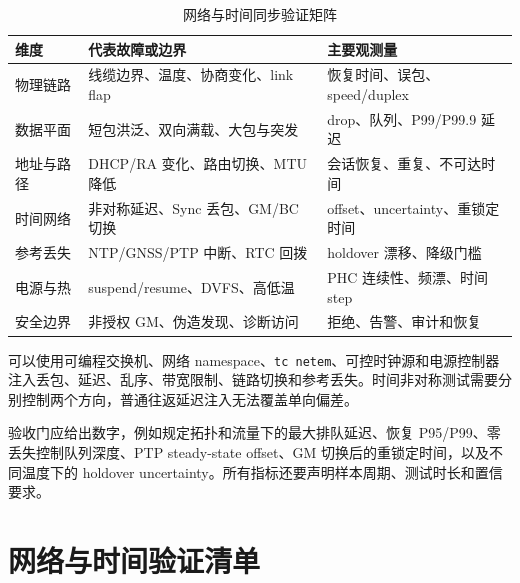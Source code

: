 \begin{table}[htbp]
  \centering
  \caption{网络与时间同步验证矩阵}
  \small
  \begin{tabular}{p{26mm}p{50mm}p{54mm}}
    \hline
    维度 & 代表故障或边界 & 主要观测量 \\
    \hline
    物理链路 & 线缆边界、温度、协商变化、link flap & 恢复时间、误包、speed/duplex \\
    数据平面 & 短包洪泛、双向满载、大包与突发 & drop、队列、P99/P99.9 延迟 \\
    地址与路径 & DHCP/RA 变化、路由切换、MTU 降低 & 会话恢复、重复、不可达时间 \\
    时间网络 & 非对称延迟、Sync 丢包、GM/BC 切换 & offset、uncertainty、重锁定时间 \\
    参考丢失 & NTP/GNSS/PTP 中断、RTC 回拨 & holdover 漂移、降级门槛 \\
    电源与热 & suspend/resume、DVFS、高低温 & PHC 连续性、频漂、时间 step \\
    安全边界 & 非授权 GM、伪造发现、诊断访问 & 拒绝、告警、审计和恢复 \\
    \hline
  \end{tabular}
\end{table}

可以使用可编程交换机、网络 namespace、\texttt{tc netem}、可控时钟源和电源控制器注入丢包、延迟、乱序、带宽限制、链路切换和参考丢失。时间非对称测试需要分别控制两个方向，普通往返延迟注入无法覆盖单向偏差。

验收门应给出数字，例如规定拓扑和流量下的最大排队延迟、恢复 P95/P99、零丢失控制队列深度、PTP steady-state offset、GM 切换后的重锁定时间，以及不同温度下的 holdover uncertainty。所有指标还要声明样本周期、测试时长和置信要求。

\section{网络与时间验证清单}

